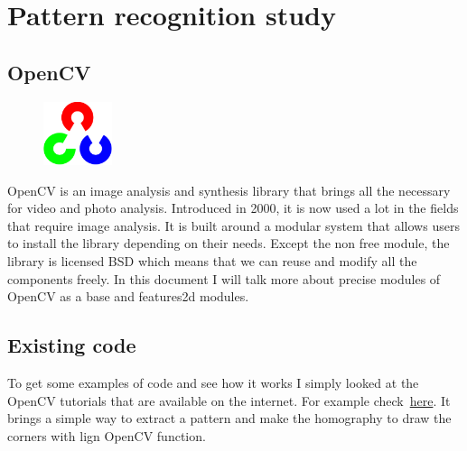 \documentclass[english,a4paper,11pt]{report}
\begin{document}
	
	
	
	
	\tableofcontents
	\newpage
	
	\setcounter{page}{1}
	
	
	
	
	
	
	\section{Pattern recognition study}
	\subsection{OpenCV}
	
		\begin{figure}
	\vspace{-7mm}
	\includegraphics[width=2cm]{images_not_compressed/opencv_logo.png}
	\end{figure}
	\par OpenCV is an image analysis and synthesis library that brings all the necessary for video and photo analysis. Introduced in 2000, it is now used a lot in the fields that require image analysis.
 It is built around a modular system that allows users to install the library depending on their needs.
 Except the non free module, the library is licensed BSD which means that we can reuse and modify all the components freely.
 In this document I will talk more about precise modules of OpenCV as a base and features2d modules.
	
	\subsection{Existing code}
	
	\par To get some examples of code and see how it works I simply looked at the OpenCV tutorials that are available on the internet. For example check~\hyperlink{opencv}{here}. It brings a simple way to extract a pattern and make the homography to draw the corners with lign OpenCV function.
	
\end{document}
